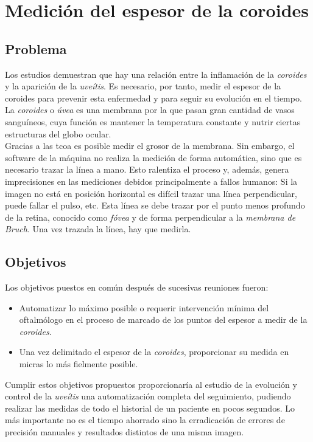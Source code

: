 \chapter{Medición del espesor de la coroides}
\section{Problema}
Los estudios demuestran que hay una relación entre la inflamación de
la \emph{coroides} y la aparición de la \emph{uveítis}. Es necesario,
por tanto, medir el espesor de la coroides para prevenir esta
enfermedad y para seguir su evolución en el tiempo.\\
La \emph{coroides} o \emph{úvea} es una membrana por la que pasan gran
cantidad de vasos sanguíneos, cuya función es mantener la temperatura
constante y nutrir ciertas estructuras del globo ocular. \\
Gracias a las \gls{tcoa} es posible medir el grosor de la
membrana. Sin embargo, el software de la máquina no realiza la
medición de forma automática, sino que es necesario trazar la línea a
mano. Esto ralentiza el proceso y, además, genera imprecisiones en las
mediciones debidos principalmente a fallos humanos: Si la imagen no
está en posición horizontal es difícil trazar una línea perpendicular,
puede fallar el pulso, etc. Esta línea se debe trazar por el punto
menos profundo de la retina, conocido como \emph{fóvea} y de forma
perpendicular a la \emph{membrana de Bruch}. Una vez trazada la línea,
hay que medirla.


\section{Objetivos}
Los objetivos puestos en común después de sucesivas reuniones fueron:
\begin{itemize}
\item Automatizar lo máximo posible o requerir intervención mínima del
  oftalmólogo en el proceso de marcado de los puntos del espesor a medir de la
  \emph{coroides}.
\item Una vez delimitado el espesor de la \emph{coroides},
  proporcionar su medida en micras lo más fielmente posible.
\end{itemize}
Cumplir estos objetivos propuestos proporcionaría al estudio de la
evolución y control de la \emph{uveítis} una automatización completa
del seguimiento, pudiendo realizar las medidas de todo el historial de
un paciente en pocos segundos. Lo más importante no es el tiempo
ahorrado sino la erradicación de errores de precisión manuales y
resultados distintos de una misma imagen.

